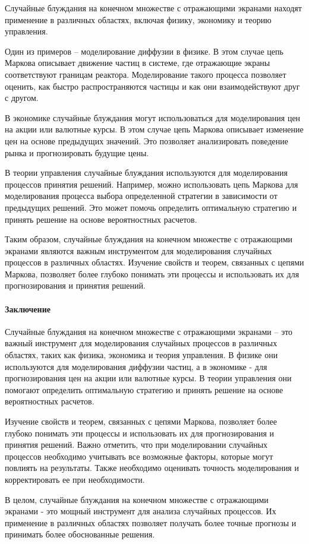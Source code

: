 Случайные блуждания на конечном множестве с отражающими экранами находят применение в различных областях, включая физику, экономику и теорию управления.

Один из примеров -- моделирование диффузии в физике. В этом случае цепь Маркова описывает движение частиц в системе, где отражающие экраны соответствуют границам реактора. Моделирование такого процесса позволяет оценить, как быстро распространяются частицы и как они взаимодействуют друг с другом.

В экономике случайные блуждания могут использоваться для моделирования цен на акции или валютные курсы. В этом случае цепь Маркова описывает изменение цен на основе предыдущих значений. Это позволяет анализировать поведение рынка и прогнозировать будущие цены.

В теории управления случайные блуждания используются для моделирования процессов принятия решений. Например, можно использовать цепь Маркова для моделирования процесса выбора определенной стратегии в зависимости от предыдущих решений. Это может помочь определить оптимальную стратегию и принять решение на основе вероятностных расчетов.

Таким образом, случайные блуждания на конечном множестве с отражающими экранами являются важным инструментом для моделирования случайных процессов в различных областях. Изучение свойств и теорем, связанных с цепями Маркова, позволяет более глубоко понимать эти процессы и использовать их для прогнозирования и принятия решений.

\paragraph{Заключение}

Случайные блуждания на конечном множестве с отражающими экранами -- это важный инструмент для моделирования случайных процессов в различных областях, таких как физика, экономика и теория управления. В физике они используются для моделирования диффузии частиц, а в экономике - для прогнозирования цен на акции или валютные курсы. В теории управления они помогают определить оптимальную стратегию и принять решение на основе вероятностных расчетов.

Изучение свойств и теорем, связанных с цепями Маркова, позволяет более глубоко понимать эти процессы и использовать их для прогнозирования и принятия решений. Важно отметить, что при моделировании случайных процессов необходимо учитывать все возможные факторы, которые могут повлиять на результаты. Также необходимо оценивать точность моделирования и корректировать ее при необходимости.

В целом, случайные блуждания на конечном множестве с отражающими экранами - это мощный инструмент для анализа случайных процессов. Их применение в различных областях позволяет получать более точные прогнозы и принимать более обоснованные решения.

